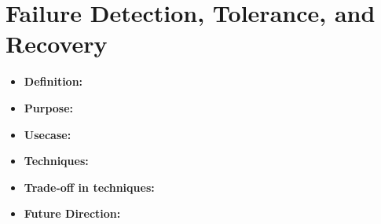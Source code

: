 \section{Failure Detection, Tolerance, and Recovery}
\label{sec:fault}

\begin{itemize}
	\item \textbf{Definition: } 
	\item \textbf{Purpose: } 
	\item \textbf{Usecase:}
	\item \textbf{Techniques: }
	\item \textbf{Trade-off in techniques: } 
	\item \textbf{Future Direction:} 
\end{itemize}



